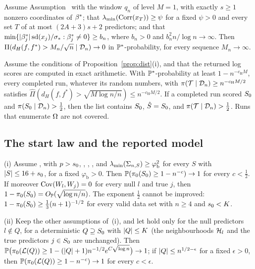 
\begin{suppthm}\label{thm:dist-param}
Assume Assumption~ with the window $q_n$ of level $M=1$, with exactly $s\ge1$ nonzero coordinates of $\bstar$;
that $\lmin(\Corr(x_T))\ge\psi$ for a fixed $\psi>0$ and every set $T$ of at most $(2A+3)s+2$ predictors; and that
$\min\{\abs{\beta^*_j}\sd(x_j)/\sigs:\beta^*_j\neq0\}\ge b_n$, where $b_n>0$ and $b_n^2n/\log n\to\infty$. Then
$\Pi(d_H(f,f^*)>M_n/\sqrt n\mid\Dn)\to0$ in $\P^*$-probability, for every sequence $M_n\to\infty$.
\end{suppthm}


\begin{supprem}\label{cor:dist-output}
Assume the conditions of Proposition~\ref{prop:dist}(i), and that the returned log scores are computed in exact
arithmetic. With $\P^*$-probability at least $1-n^{-c_{\mathrm H}M}$, every completed run, whatever its random numbers, with
$\pi(\mathcal T\mid\Dn)\ge n^{-c_{\mathrm H}M/2}$ satisfies $\hat\Pi(d_H(f,f^*)>\sqrt{M\log n/n})\le n^{-c_{\mathrm H}M/2}$. If a
completed run scored $\Sz$ and $\pi(\Sz\mid\Dn)>\tfrac12$, then the list contains $\Sz$, $\Shat=\Sz$, and $\pi(\mathcal
T\mid\Dn)>\tfrac12$. Runs that enumerate $\Om$ are not covered.
\end{supprem}


\subsection{The start law and the reported model}\label{sec:supp-method}

\begin{suppthm}\label{thm:start}
\textup{(i)} Assume ,  with $p>\sz$, , , , and $\lmin(\Sigma_{n,S})\ge\varphi_{\mathrm b}^2$
for every $S$ with $\abs{S}\le16+\sz$, for a fixed $\varphi_{\mathrm b}>0$. Then $\P(\pi_0(\Sz)\ge1-n^{-c})\to1$ for every
$c<\tfrac12$. If moreover $\Cov(W_l,W_j)=0$ for every null $l$ and true $j$, then $1-\pi_0(\Sz)=\OP(\rn)$. The exponent
$\tfrac12$ cannot be improved: $1-\pi_0(\Sz)\ge\tfrac13(n+1)^{-1/2}$ for every valid data set with $n\ge4$ and $\sz<K$.

\textup{(ii)} Keep the other assumptions of~(i), and let  hold only for the null predictors $l\notin Q$, for a
deterministic $Q\supseteq\Sz$ with $\abs{Q}\le K$ (the neighbourhoods $\Hl_l$ and the true predictors $j\in\Sz$ are
unchanged). Then $\P\big(\pi_0(\Lat(Q))\ge1-(\abs{Q}+1)n^{-1/2}e^{C\sqrt{\log n}}\big)\to1$; if $\abs{Q}\le
n^{1/2-\epsilon}$ for a fixed $\epsilon>0$, then $\P(\pi_0(\Lat(Q))\ge1-n^{-c})\to1$ for every $c<\epsilon$.
\end{suppthm}

